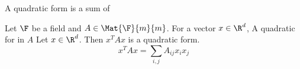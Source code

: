 


A quadratic form is a sum of


Let $\F$ be a field and $A \in \Mat{\F}{m}{m}$.
For a vector $x \in \R^d$, A quadratic for in $A$
Let $x \in \R^d$.
Then $x^T A x$ is a quadratic form.
\[
  x^T A x = \sum_{i,j} A_{ij}x_{i}x_{j}
\]

